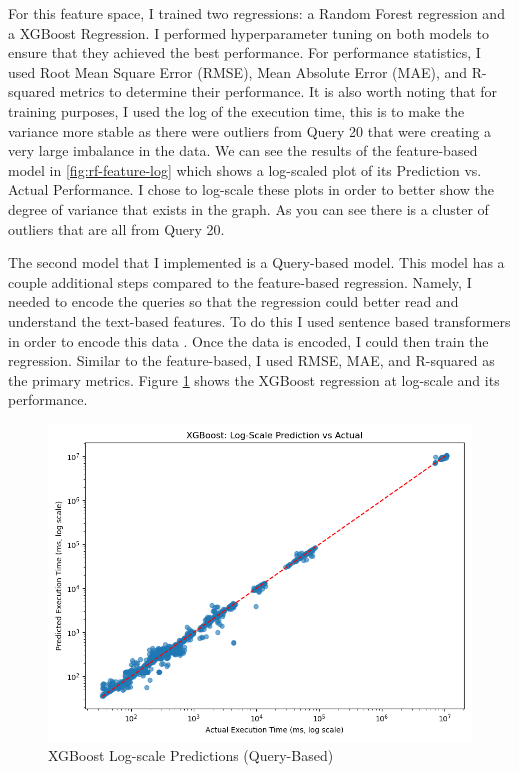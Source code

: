 \documentclass[sigconf]{acmart}
\begin{document}
For this feature space, I trained two regressions: a Random Forest regression and a XGBoost Regression. I performed hyperparameter tuning on both models to ensure that they achieved the best performance.
For performance statistics, I used Root Mean Square Error (RMSE), Mean Absolute Error (MAE), and R-squared metrics to determine their performance. It is also worth noting that for training purposes, I used the log
of the execution time, this is to make the variance more stable as there were outliers from Query 20 that were creating a very large imbalance in the data. We can see the results of the feature-based model in \ref{fig:rf-feature-log}
which shows a log-scaled plot of its Prediction vs. Actual Performance. I chose to log-scale these plots in order to better show the degree of variance that exists in the graph. As you can see there is a cluster of outliers that
are all from Query 20.


The second model that I implemented is a Query-based model. This model has a couple additional steps compared to the feature-based regression. Namely, I needed to encode the queries so that the regression could better
read and understand the text-based features. To do this I used sentence based transformers in order to encode this data \cite{reimers2019sentencebertsentenceembeddingsusing}. Once the data is encoded, I could then train the
regression. Similar to the feature-based, I used RMSE, MAE, and R-squared as the primary metrics. Figure \ref{fig:xgb-query-log} shows the XGBoost regression at log-scale and its performance.

\begin{figure}[h!]
  \centering
  \includegraphics[width=\linewidth]{query_based_xgb/logscale.png}
  \caption{XGBoost Log-scale Predictions (Query-Based)}
  \label{fig:xgb-query-log}
\end{figure}
\end{document}
